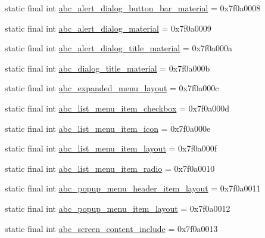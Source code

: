 \begin{DoxyCompactItemize}
static final int \mbox{\hyperlink{classcom_1_1synnapps_1_1carouselview_1_1_r_1_1layout_adf82508cac6e55a180e37668897d10ea}{abc\+\_\+alert\+\_\+dialog\+\_\+button\+\_\+bar\+\_\+material}} = 0x7f0a0008
\item 
static final int \mbox{\hyperlink{classcom_1_1synnapps_1_1carouselview_1_1_r_1_1layout_ad57b690be440ffff3f79e9c5732b91c8}{abc\+\_\+alert\+\_\+dialog\+\_\+material}} = 0x7f0a0009
\item 
static final int \mbox{\hyperlink{classcom_1_1synnapps_1_1carouselview_1_1_r_1_1layout_a61b458913e762c43eefa7a3bbbf31374}{abc\+\_\+alert\+\_\+dialog\+\_\+title\+\_\+material}} = 0x7f0a000a
\item 
static final int \mbox{\hyperlink{classcom_1_1synnapps_1_1carouselview_1_1_r_1_1layout_a37582e0a392ef17eae6b549b94f1e804}{abc\+\_\+dialog\+\_\+title\+\_\+material}} = 0x7f0a000b
\item 
static final int \mbox{\hyperlink{classcom_1_1synnapps_1_1carouselview_1_1_r_1_1layout_a1ac3afa51687f1b44492c250e1505c67}{abc\+\_\+expanded\+\_\+menu\+\_\+layout}} = 0x7f0a000c
\item 
static final int \mbox{\hyperlink{classcom_1_1synnapps_1_1carouselview_1_1_r_1_1layout_afc70487d4b8d49bccc73b9c022a5c120}{abc\+\_\+list\+\_\+menu\+\_\+item\+\_\+checkbox}} = 0x7f0a000d
\item 
static final int \mbox{\hyperlink{classcom_1_1synnapps_1_1carouselview_1_1_r_1_1layout_ab4cf7ecbd1a2db304f17a7ea39a19844}{abc\+\_\+list\+\_\+menu\+\_\+item\+\_\+icon}} = 0x7f0a000e
\item 
static final int \mbox{\hyperlink{classcom_1_1synnapps_1_1carouselview_1_1_r_1_1layout_a10711da97f400f71f1ee76a3a0d059b2}{abc\+\_\+list\+\_\+menu\+\_\+item\+\_\+layout}} = 0x7f0a000f
\item 
static final int \mbox{\hyperlink{classcom_1_1synnapps_1_1carouselview_1_1_r_1_1layout_a457ada10aa6f72b0d2b26adbf231d18f}{abc\+\_\+list\+\_\+menu\+\_\+item\+\_\+radio}} = 0x7f0a0010
\item 
static final int \mbox{\hyperlink{classcom_1_1synnapps_1_1carouselview_1_1_r_1_1layout_a960a05591ef19da190979505a78fc25d}{abc\+\_\+popup\+\_\+menu\+\_\+header\+\_\+item\+\_\+layout}} = 0x7f0a0011
\item 
static final int \mbox{\hyperlink{classcom_1_1synnapps_1_1carouselview_1_1_r_1_1layout_a98d75e8f5953e359c17edcdbe36abee9}{abc\+\_\+popup\+\_\+menu\+\_\+item\+\_\+layout}} = 0x7f0a0012
\item 
static final int \mbox{\hyperlink{classcom_1_1synnapps_1_1carouselview_1_1_r_1_1layout_a7311aaa5018121f9fc24c69aa9899239}{abc\+\_\+screen\+\_\+content\+\_\+include}} = 0x7f0a0013

\end{DoxyCompactItemize}
